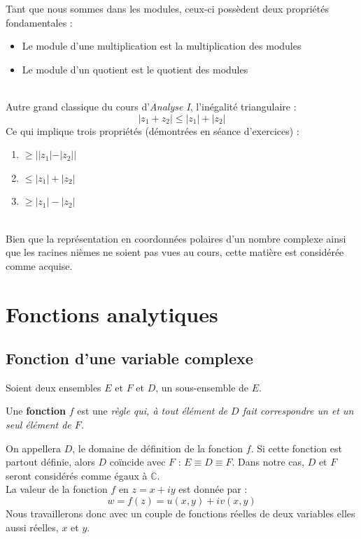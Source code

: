         Tant que nous sommes dans les modules, ceux-ci possèdent deux propriétés 
        fondamentales :
        \begin{itemize}
        \item Le module d'une multiplication est la multiplication des modules
        \item Le module d'un quotient est le quotient des modules
        \end{itemize}\ \\
        
        Autre grand classique du cours d'\textit{Analyse I}, l'inégalité triangulaire :
        \begin{equation}
            |z_1 + z_2| \leq |z_1|+|z_2|
        \end{equation}
        Ce qui implique trois propriétés (démontrées en séance d'exercices) :
        \begin{enumerate}
        \item {} $\geq ||z_1| - |z_2||$
        \item {} $\leq |z_1| + |z_2|$
        \item {} $\geq |z_1| - |z_2|$
        \end{enumerate}\ \\
        
        Bien que la représentation en coordonnées polaires d'un nombre complexe ainsi que
        les racines nièmes ne soient pas vues au cours, cette matière est considérée comme
        acquise.

        
\section{Fonctions analytiques}
    \subsection{Fonction d'une variable complexe}
    Soient deux ensembles $E$ et $F$ et $D$, un sous-ensemble de $E$. 
    \begin{center}
    Une \textbf{fonction}
    $f$ est une \textit{règle qui, à tout élément de $D$ fait correspondre un et un seul
    élément de $F$.}
    \end{center}
    On appellera $D$, le domaine de définition de la fonction $f$. Si cette fonction est 
    partout définie, alors $D$ coïncide avec $F$ : $E \equiv D \equiv F$. Dans notre cas, $D$ et $F$
    seront considérés comme égaux à $\mathbb{C}$.\\
    La valeur de la fonction $f$ en $z = x+iy$ est donnée par :
    \begin{equation}
        w = f(z) = u(x,y) + iv(x,y)
    \end{equation}
    Nous travaillerons donc avec un couple de  fonctions réelles de deux variables elles 
    aussi réelles, $x$ et $y$.
    

